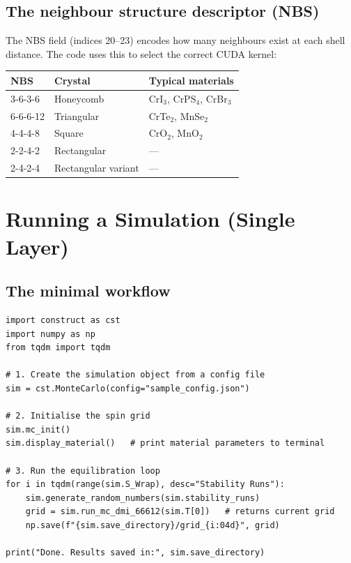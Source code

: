 \documentclass[12pt,a4paper]{article}
\begin{document}
\subsection{The neighbour structure descriptor (NBS)}

The NBS field (indices 20--23) encodes how many neighbours exist at each shell
distance. The code uses this to select the correct CUDA kernel:

\begin{center}
\begin{tabular}{lll}
\toprule
\textbf{NBS} & \textbf{Crystal} & \textbf{Typical materials} \\
\midrule
3-6-3-6  & Honeycomb & CrI$_3$, CrPS$_4$, CrBr$_3$ \\
6-6-6-12 & Triangular & CrTe$_2$, MnSe$_2$ \\
4-4-4-8  & Square    & CrO$_2$, MnO$_2$ \\
2-2-4-2  & Rectangular & --- \\
2-4-2-4  & Rectangular variant & --- \\
\bottomrule
\end{tabular}
\end{center}

\section{Running a Simulation (Single Layer)}
\label{sec:singlelayer}

\subsection{The minimal workflow}

\begin{lstlisting}[style=python, caption={Minimal single-layer simulation --- sample.py}]
import construct as cst
import numpy as np
from tqdm import tqdm

# 1. Create the simulation object from a config file
sim = cst.MonteCarlo(config="sample_config.json")

# 2. Initialise the spin grid
sim.mc_init()
sim.display_material()   # print material parameters to terminal

# 3. Run the equilibration loop
for i in tqdm(range(sim.S_Wrap), desc="Stability Runs"):
    sim.generate_random_numbers(sim.stability_runs)
    grid = sim.run_mc_dmi_66612(sim.T[0])   # returns current grid
    np.save(f"{sim.save_directory}/grid_{i:04d}", grid)

print("Done. Results saved in:", sim.save_directory)
\end{lstlisting}
\end{document}
